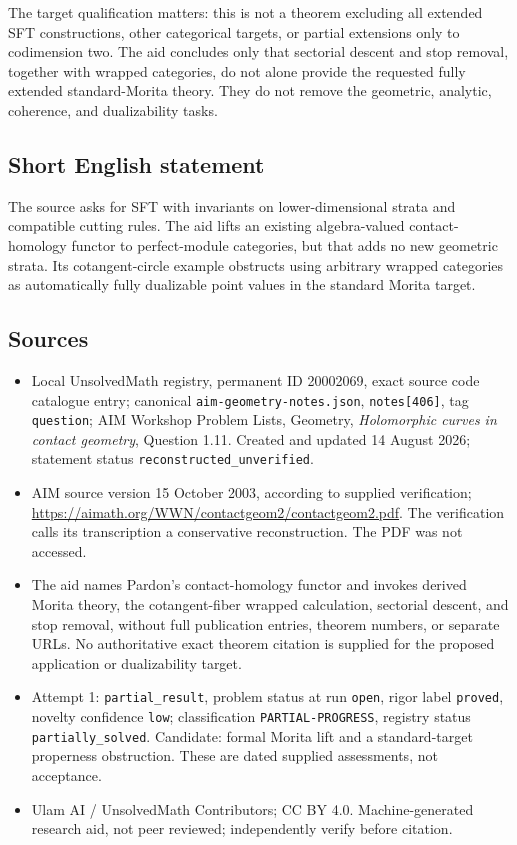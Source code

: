 \documentclass[11pt]{article}
\begin{document}
The target qualification matters: this is not a theorem excluding all extended SFT constructions, other categorical targets, or partial extensions only to codimension two. The aid concludes only that sectorial descent and stop removal, together with wrapped categories, do not alone provide the requested fully extended standard-Morita theory. They do not remove the geometric, analytic, coherence, and dualizability tasks.
\subsection{Short English statement}
The source asks for SFT with invariants on lower-dimensional strata and compatible cutting rules. The aid lifts an existing algebra-valued contact-homology functor to perfect-module categories, but that adds no new geometric strata. Its cotangent-circle example obstructs using arbitrary wrapped categories as automatically fully dualizable point values in the standard Morita target.
\subsection{Sources}
\begin{itemize}
\item Local UnsolvedMath registry, permanent ID 20002069, exact source code catalogue entry; canonical \texttt{aim-geometry-notes.json}, \texttt{notes[406]}, tag \texttt{question}; AIM Workshop Problem Lists, Geometry, \emph{Holomorphic curves in contact geometry}, Question 1.11. Created and updated 14 August 2026; statement status \texttt{reconstructed\_unverified}.
\item AIM source version 15 October 2003, according to supplied verification; \url{https://aimath.org/WWN/contactgeom2/contactgeom2.pdf}. The verification calls its transcription a conservative reconstruction. The PDF was not accessed.
\item The aid names Pardon's contact-homology functor and invokes derived Morita theory, the cotangent-fiber wrapped calculation, sectorial descent, and stop removal, without full publication entries, theorem numbers, or separate URLs. No authoritative exact theorem citation is supplied for the proposed application or dualizability target.
\item Attempt 1: \texttt{partial\_result}, problem status at run \texttt{open}, rigor label \texttt{proved}, novelty confidence \texttt{low}; classification \texttt{PARTIAL-PROGRESS}, registry status \texttt{partially\_solved}. Candidate: formal Morita lift and a standard-target properness obstruction. These are dated supplied assessments, not acceptance.
\item Ulam AI / UnsolvedMath Contributors; CC BY 4.0. Machine-generated research aid, not peer reviewed; independently verify before citation.
\end{itemize}
\end{document}
